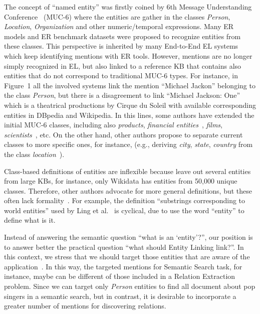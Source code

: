 \documentclass[sigconf]{acmart}
\begin{document}
The concept of ``named entity'' was firstly coined by 6th Message Understanding Conference~\cite{GrishmanS96} (MUC-6) where the entities are gather in the classes \textit{Person}, \textit{Location}, \textit{Organization} and other numeric/temporal expressions. Many ER models and ER benchmark datasets were proposed to recognize entities from these classes. This perspective is inherited by many End-to-End EL systems which keep identifying mentions with ER tools. However, mentions are no longer simply recognized in EL, but also linked to a reference KB that contains also entities that do not correspond to traditional MUC-6 types. For instance, in Figure~1 all the involved systems link the mention ``Michael Jackon'' belonging to the class \textit{Person}, but there is a disagreement to link ``Michael Jackson: One'' which is a theatrical productions by Cirque du Soleil with available corresponding entities in DBpedia and Wikipedia. In this lines, some authors have extended the initial MUC-6 classes, including also \textit{products}, \textit{financial entities}~\cite{MinardSUAESS16}, \textit{films}, \textit{scientists}~\cite{EtzioniCDPSSWY05}, etc. On the other hand, other authors propose to separate current classes to more specific ones, for instance, (e.g., deriving \textit{city}, \textit{state}, \textit{country} from the class \textit{location}~\cite{Fleischman01}).

Class-based definitions of entities are inflexible because leave out several entities from large KBs, for instance, only Wikidata has entities from 50,000 unique classes. Therefore, other authors advocate for more general definitions, but these often lack formality~\cite{EckhardtHPS14, UrenCIHVMC06}. For example, the definition ``substrings corresponding to world entities'' used by Ling et al.~\cite{LingSW15} is cyclical, due to use the word ``entity'' to define what is it. 

Instead of answering the semantic question ``what is an `entity'?'', our position is to answer better the practical question ``what should Entity Linking link?''. In this context, we stress that we should target those entities that are aware of the application~\cite{ourAMW2018}. In this way, the targeted mentions for Semantic Search task, for instance, maybe can be different of those included in a Relation Extraction problem. Since we can target only \textit{Person} entities to find all document about pop singers in a semantic search, but in contrast, it is desirable to incorporate a greater number of mentions for discovering relations. 
\end{document}

